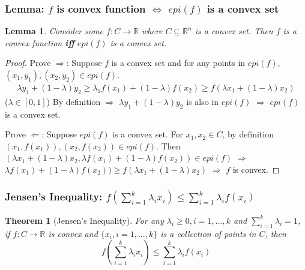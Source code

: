 \documentclass[11pt,a4paper]{article}
\newtheorem{theorem}{Theorem}
\newtheorem{lemma}{Lemma}
\begin{document}
\subsubsection{Lemma: $f$ is convex function $\Leftrightarrow$ ${epi}(f)$ is a convex set}
\begin{lemma}
    Consider some $f: C \rightarrow \mathbb{R}$ where $C\subseteq \mathbb{R}^n$ is a convex set. Then $f$ is a convex function \textbf{iff} ${epi}(f)$ is a convex set.
\end{lemma}
\begin{proof}
Prove $\Rightarrow$: Suppose $f$ is a convex set and for any points in $epi(f)$, $(x_1,y_1),(x_2,y_2)\in epi(f)$.
\begin{equation}
    \begin{aligned}
        \lambda y_1+(1-\lambda)y_2\geq \lambda_1f(x_1)+(1-\lambda)f(x_2)\geq f(\lambda x_1+(1-\lambda)x_2)
    \end{aligned}
    \nonumber
\end{equation}
($\lambda\in[0,1]$)
By definition $\Rightarrow$ $\lambda y_1+(1-\lambda)y_2$ is also in ${epi}(f)$ $\Rightarrow$ ${epi}(f)$ is a convex set.

Prove $\Leftarrow$: Suppose ${epi}(f)$ is a convex set. For $x_1,x_2\in C$, by definition $(x_1,f(x_1)),(x_2,f(x_2))\in {epi}(f)$. Then $(\lambda x_1+(1-\lambda)x_2,\lambda f(x_1)+(1-\lambda)f(x_2))\in {epi}(f)$ $\Rightarrow$ $\lambda f(x_1)+(1-\lambda)f(x_2))\geq f(\lambda x_1+(1-\lambda)x_2)$ $\Rightarrow$ $f$ is convex.
\end{proof}

\subsubsection{Jensen's Inequality: $f(\sum_{i=1}^k\lambda_i x_i)\leq \sum_{i=1}^k\lambda_if(x_i)$}
\begin{theorem}[Jensen's Inequality]
    For any $\lambda_i\geq 0,i=1,...,k$ and $\sum_{i=1}^k\lambda_i=1$, if $f: C \rightarrow \mathbb{R}$ is convex and $\{x_i,i=1,...,k\}$ is a collection of points in $C$, then $$f(\sum_{i=1}^k\lambda_i x_i)\leq \sum_{i=1}^k\lambda_if(x_i)$$
\end{theorem}
\end{document}
